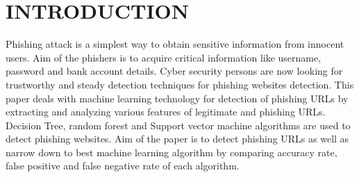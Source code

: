 \chapter{INTRODUCTION}
\thispagestyle{empty}
\onehalfspacing
\pagestyle{fancy}
\fancyhf{}
\fancyhead[LE,RO]{\textit{\footnotesize \thepage}}
 
\renewcommand{\headrulewidth}{2pt}
\renewcommand{\footrulewidth}{1pt}

Phishing  attack  is  a  simplest  way  to  obtain  sensitive information  from innocent  users. Aim  of the  phishers  is to acquire critical information like username, password and bank account details.  Cyber security  persons are now looking for trustworthy  and  steady  detection  techniques  for  phishing websites  detection. This  paper  deals with  machine learning technology for detection of phishing URLs by extracting and analyzing various features of legitimate and phishing URLs. Decision  Tree,  random  forest  and  Support  vector  machine algorithms are used to detect phishing  websites. Aim of the paper is to detect phishing URLs as  well as narrow down to best machine learning algorithm by comparing accuracy rate, false positive and false negative rate of each algorithm.






















































